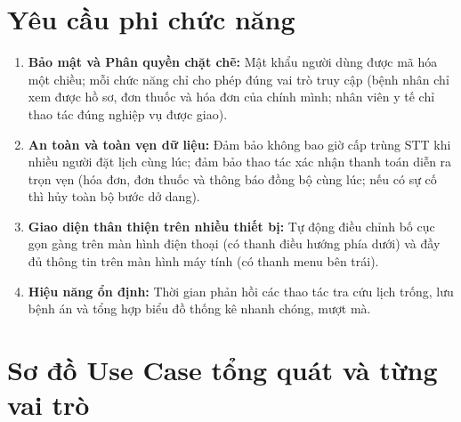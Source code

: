 \documentclass[12pt,a4paper]{report}
\begin{document}
\section{Yêu cầu phi chức năng}
\begin{enumerate}
  \item \textbf{Bảo mật và Phân quyền chặt chẽ:} Mật khẩu người dùng được mã hóa một chiều; mỗi chức năng chỉ cho phép đúng vai trò truy cập (bệnh nhân chỉ xem được hồ sơ, đơn thuốc và hóa đơn của chính mình; nhân viên y tế chỉ thao tác đúng nghiệp vụ được giao).
  \item \textbf{An toàn và toàn vẹn dữ liệu:} Đảm bảo không bao giờ cấp trùng STT khi nhiều người đặt lịch cùng lúc; đảm bảo thao tác xác nhận thanh toán diễn ra trọn vẹn (hóa đơn, đơn thuốc và thông báo đồng bộ cùng lúc; nếu có sự cố thì hủy toàn bộ bước dở dang).
  \item \textbf{Giao diện thân thiện trên nhiều thiết bị:} Tự động điều chỉnh bố cục gọn gàng trên màn hình điện thoại (có thanh điều hướng phía dưới) và đầy đủ thông tin trên màn hình máy tính (có thanh menu bên trái).
  \item \textbf{Hiệu năng ổn định:} Thời gian phản hồi các thao tác tra cứu lịch trống, lưu bệnh án và tổng hợp biểu đồ thống kê nhanh chóng, mượt mà.
\end{enumerate}

\section{Sơ đồ Use Case tổng quát và từng vai trò}
\end{document}
